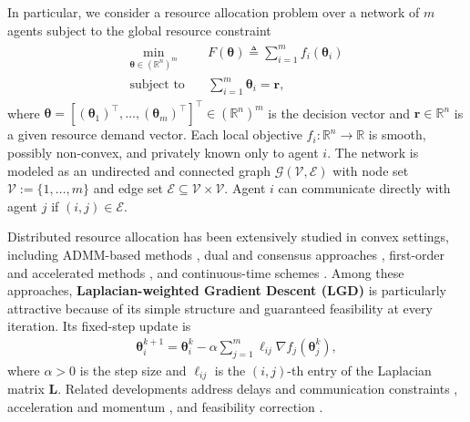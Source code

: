 \documentclass{siamart251216}
\begin{document}
In particular, we consider a resource allocation problem over a network of $m$ agents subject to the global resource constraint
\begin{gather}
    \label{eq: Resource allocation problem}
    \begin{aligned}
        \min_{\boldsymbol{\theta} \in (\mathbb{R}^{n})^{m}} \quad & F(\boldsymbol{\theta}) \triangleq \sum_{i=1}^{m} f_{i}(\boldsymbol{\theta}_{i})\\
        \text{subject to} \quad & \sum_{i=1}^{m} \boldsymbol{\theta}_{i} = \mathbf{r},
    \end{aligned}
\end{gather}
where $\boldsymbol{\theta}=[(\boldsymbol{\theta}_{1})^{\top},\dots,(\boldsymbol{\theta}_{m})^{\top}]^{\top}\in(\mathbb{R}^{n})^{m}$ is the decision vector and $\mathbf{r}\in\mathbb{R}^{n}$ is a given resource demand vector. Each local objective $f_i:\mathbb{R}^{n}\rightarrow\mathbb{R}$ is smooth, possibly non-convex, and privately known only to agent $i$. The network is modeled as an undirected and connected graph $\mathcal{G}(\mathcal{V},\mathcal{E})$ with node set $\mathcal{V}:=\{1,\ldots,m\}$ and edge set $\mathcal{E}\subseteq\mathcal{V}\times\mathcal{V}$. Agent $i$ can communicate directly with agent $j$ if $(i,j)\in\mathcal{E}$.

Distributed resource allocation has been extensively studied in convex settings, including ADMM-based methods \cite{chang2014multi,chang2016proximal,aybat2019distributed}, dual and consensus approaches \cite{zhang2019distributed,yuan2019stochastic}, first-order and accelerated methods \cite{beck20141,necoara2013random,ghadimi2011accelerated}, and continuous-time schemes \cite{zhu2019distributed,deng2017distributed}. Among these approaches, \textbf{Laplacian-weighted Gradient Descent (LGD)} \cite{xiao2006optimal,ho1980class} is particularly attractive because of its simple structure and guaranteed feasibility at every iteration. Its fixed-step update is
\begin{gather}
    \label{eq: LGD}
    \boldsymbol{\theta}_{i}^{k+1}=\boldsymbol{\theta}_{i}^{k}-\alpha\sum_{j=1}^{m}\ell_{ij}\nabla f_{j}(\boldsymbol{\theta}_{j}^{k}),
\end{gather}
where $\alpha>0$ is the step size and $\ell_{ij}$ is the $(i,j)$-th entry of the Laplacian matrix $\mathbf{L}$. Related developments address delays and communication constraints \cite{doostmohammadian20221st,doostmohammadian2022distributed}, acceleration and momentum \cite{ghadimi2011accelerated,ochoa2019hybrid,doostmohammadian2024accelerated}, and feasibility correction \cite{li2022implicit}.
\end{document}
